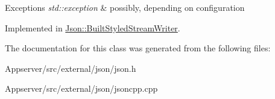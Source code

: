 \begin{DoxyExceptions}{Exceptions}
{\em std\+::exception} & possibly, depending on configuration \\
\hline
\end{DoxyExceptions}


Implemented in \hyperlink{structJson_1_1BuiltStyledStreamWriter_a823cdb1afabb6b0d5f39bcd5a6a6f747}{Json\+::\+Built\+Styled\+Stream\+Writer}.



The documentation for this class was generated from the following files\+:\begin{DoxyCompactItemize}
\item 
Appserver/src/external/json/json.\+h\item 
Appserver/src/external/json/jsoncpp.\+cpp\end{DoxyCompactItemize}
